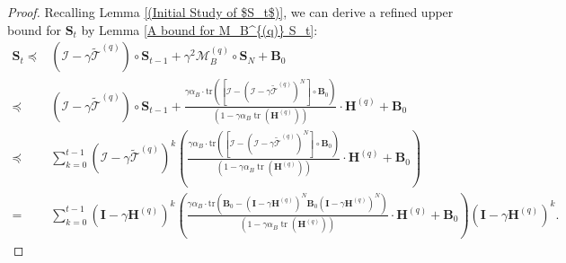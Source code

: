 \documentclass[11pt, letterpaper]{article}
\begin{document}
\begin{proof}
    Recalling Lemma \ref{(Initial Study of $S_t$)}, we can derive a refined upper bound for $\mathbf{S}_t$ by Lemma \ref{A bound for M_B^{(q)} S_t}:
    \begin{equation}
    \label{Bound for S_t}
        \begin{aligned}
            \mathbf{S}_t\preceq&(\mathcal{I}-\gamma\tilde{\mathcal{T}}^{(q)})\circ\mathbf{S}_{t-1}+\gamma^{2}\mathcal{M}_B^{(q)}\circ\mathbf{S}_{N}+\mathbf{B}_{0}\\
            \preceq&(\mathcal{I}-\gamma\tilde{\mathcal{T}}^{(q)})\circ\mathbf{S}_{t-1}+\frac{\gamma\alpha_B\cdot\mathrm{tr}\left(\left[\mathcal{I}-(\mathcal{I}-\gamma\widetilde{\mathcal{T}}^{(q)})^N\right]\circ\mathbf{B}_0\right)}{(1-\gamma\alpha_B\operatorname{tr}(\mathbf{H}^{(q)}))}\cdot\mathbf{H}^{(q)}+\mathbf{B}_{0}\\
            \preceq&\sum_{k=0}^{t-1}(\mathcal{I}-\gamma\tilde{\mathcal{T}}^{(q)})^k\left(\frac{\gamma\alpha_B\cdot\mathrm{tr}\left(\left[\mathcal{I}-(\mathcal{I}-\gamma\widetilde{\mathcal{T}}^{(q)})^N\right]\circ\mathbf{B}_0\right)}{(1-\gamma\alpha_B\operatorname{tr}(\mathbf{H}^{(q)}))}\cdot\mathbf{H}^{(q)}+\mathbf{B}_{0}\right)\\
            =&\sum_{k=0}^{t-1}(\mathbf{I}-\gamma\mathbf{H}^{(q)})^k\left(\frac{\gamma\alpha_B\cdot\mathrm{tr}\left(\mathbf{B}_0-(\mathbf{I}-\gamma \mathbf{H}^{(q)})^N\mathbf{B}_0(\mathbf{I}-\gamma \mathbf{H}^{(q)})^N\right)}{(1-\gamma\alpha_B\operatorname{tr}(\mathbf{H}^{(q)}))}\cdot\mathbf{H}^{(q)}+\mathbf{B}_{0}\right)(\mathbf{I}-\gamma\mathbf{H}^{(q)})^k.
        \end{aligned}
    \end{equation}


\end{proof}
\end{document}
